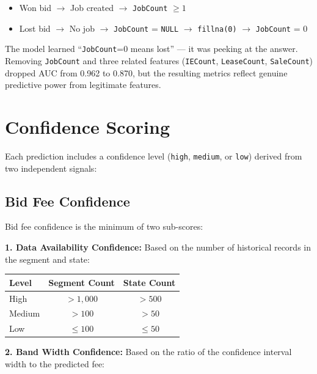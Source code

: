 \documentclass[12pt,a4paper]{article}
\begin{document}
\begin{itemize}[nosep]
    \item Won bid $\to$ Job created $\to$ \texttt{JobCount} $\geq 1$
    \item Lost bid $\to$ No job $\to$ \texttt{JobCount} = \texttt{NULL} $\to$ \texttt{fillna(0)} $\to$ \texttt{JobCount} = 0
\end{itemize}

The model learned ``\texttt{JobCount}=0 means lost'' --- it was peeking at the answer. Removing \texttt{JobCount} and three related features (\texttt{IECount}, \texttt{LeaseCount}, \texttt{SaleCount}) dropped AUC from 0.962 to 0.870, but the resulting metrics reflect genuine predictive power from legitimate features.

\section{Confidence Scoring}
\label{sec:confidence}

Each prediction includes a confidence level (\texttt{high}, \texttt{medium}, or \texttt{low}) derived from two independent signals:

\subsection{Bid Fee Confidence}

Bid fee confidence is the minimum of two sub-scores:

\textbf{1. Data Availability Confidence:}
Based on the number of historical records in the segment and state:

\begin{table}[H]
\centering
\begin{tabular}{lcc}
\toprule
\textbf{Level} & \textbf{Segment Count} & \textbf{State Count} \\
\midrule
High & $> 1{,}000$ & $> 500$ \\
Medium & $> 100$ & $> 50$ \\
Low & $\leq 100$ & $\leq 50$ \\
\bottomrule
\end{tabular}
\end{table}

\textbf{2. Band Width Confidence:}
Based on the ratio of the confidence interval width to the predicted fee:
\end{document}
